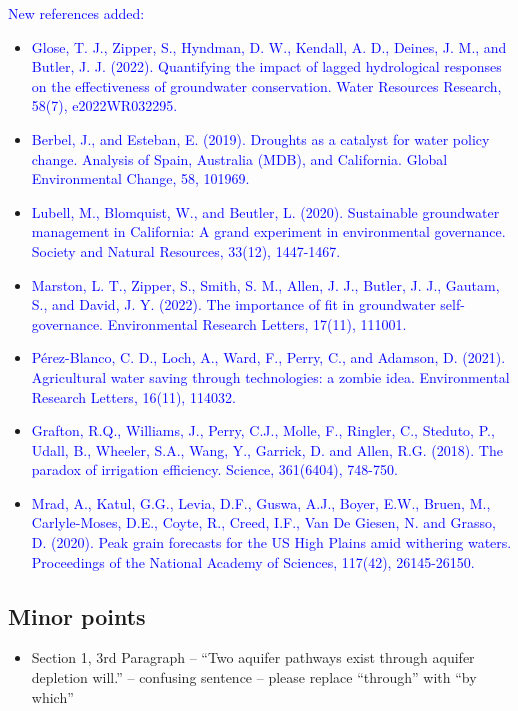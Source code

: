 \documentclass[
]{article}
\providecommand{\tightlist}{%
  \setlength{\itemsep}{0pt}\setlength{\parskip}{0pt}}
\begin{document}
\textcolor{blue}{New references added:}

\begin{itemize}
\item
  \textcolor{blue}{Glose, T. J., Zipper, S., Hyndman, D. W., Kendall, A. D., Deines, J. M., and Butler, J. J. (2022). Quantifying the impact of lagged hydrological responses on the effectiveness of groundwater conservation. Water Resources Research, 58(7), e2022WR032295.}
\item
  \textcolor{blue}{Berbel, J., and Esteban, E. (2019). Droughts as a catalyst for water policy change. Analysis of Spain, Australia (MDB), and California. Global Environmental Change, 58, 101969.}
\item
  \textcolor{blue}{Lubell, M., Blomquist, W., and Beutler, L. (2020). Sustainable groundwater management in California: A grand experiment in environmental governance. Society and Natural Resources, 33(12), 1447-1467.}
\item
  \textcolor{blue}{Marston, L. T., Zipper, S., Smith, S. M., Allen, J. J., Butler, J. J., Gautam, S., and David, J. Y. (2022). The importance of fit in groundwater self-governance. Environmental Research Letters, 17(11), 111001.}
\item 
  \textcolor{blue}{Pérez-Blanco, C. D., Loch, A., Ward, F., Perry, C., and Adamson, D. (2021). Agricultural water saving through technologies: a zombie idea. Environmental Research Letters, 16(11), 114032.}
\item 
  \textcolor{blue}{Grafton, R.Q., Williams, J., Perry, C.J., Molle, F., Ringler, C., Steduto, P., Udall, B., Wheeler, S.A., Wang, Y., Garrick, D. and Allen, R.G. (2018). The paradox of irrigation efficiency. Science, 361(6404), 748-750.}
\item 
  \textcolor{blue}{Mrad, A., Katul, G.G., Levia, D.F., Guswa, A.J., Boyer, E.W., Bruen, M., Carlyle-Moses, D.E., Coyte, R., Creed, I.F., Van De Giesen, N. and Grasso, D. (2020). Peak grain forecasts for the US High Plains amid withering waters. Proceedings of the National Academy of Sciences, 117(42), 26145-26150.}
\end{itemize}

\hypertarget{minor-points}{%
\subsection{Minor points}\label{minor-points}}

\begin{itemize}
\tightlist
\item
  Section 1, 3rd Paragraph -- ``Two aquifer pathways exist through aquifer depletion will.'' – confusing sentence – please replace ``through'' with ``by which''
\end{itemize}
\end{document}
